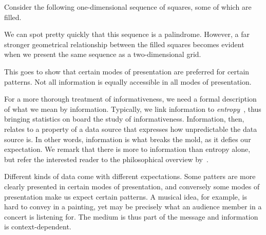 \begin{example}
  Consider the following one-dimensional sequence of squares, some of which are filled.
  \begin{center}
  \end{center}
  We can spot pretty quickly that this sequence is a palindrome.
  However, a far stronger geometrical relationship between the filled squares becomes evident when we present the same sequence as a two-dimensional grid.
  \begin{center}
  \end{center}
  This goes to show that certain modes of presentation are preferred for certain patterns.
  Not all information is equally accessible in all modes of presentation.
\end{example}

For a more thorough treatment of informativeness, we need a formal description of what we mean by information.
Typically, we link information to \emph{entropy}~\parencite{cover2006elements}, thus bringing statistics on board the study of informativeness.
Information, then, relates to a property of a data source that expresses how unpredictable the data source is.
In other words, information is what breaks the mold, as it defies our expectation.
We remark that there is more to information than entropy alone, but refer the interested reader to the philosophical overview by~\textcite{adriaans2008philosophy}.

Different kinds of data come with different expectations.
Some patters are more clearly presented in certain modes of presentation, and conversely some modes of presentation make us expect certain patterns.
A musical idea, for example, is hard to convey in a painting, yet may be precisely what an audience member in a concert is listening for.
The medium is thus part of the message and information is context-dependent.

